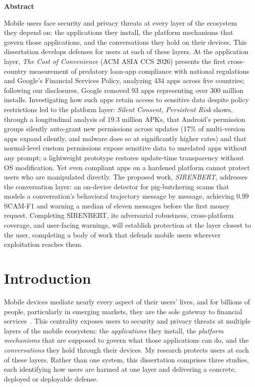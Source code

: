 \documentclass[letterpaper,11pt]{article}
\begin{document}
\begin{titlepage}
\begin{center}\bfseries Abstract\end{center}
\noindent
Mobile users face security and privacy threats at every layer of the
ecosystem they depend on: the applications they install, the platform
mechanisms that govern those applications, and the conversations they
hold on their devices. This dissertation develops defenses for users at
each of these layers. At the application layer, \emph{The Cost of
Convenience} (ACM ASIA CCS 2026) presents the first cross-country
measurement of predatory loan-app compliance with national regulations
and Google's Financial Services Policy, analyzing 434 apps across five
countries; following our disclosures, Google removed 93 apps
representing over 300 million installs. Investigating how such apps
retain access to sensitive data despite policy restrictions led to the
platform layer: \emph{Silent Consent, Persistent Risk} shows, through a
longitudinal analysis of 19.3 million APKs, that Android's permission
groups silently auto-grant new permissions across updates (17\% of
multi-version apps expand silently, and malware does so at
significantly higher rates) and that normal-level custom permissions
expose sensitive data to unrelated apps without any prompt; a
lightweight prototype restores update-time transparency without OS
modification. Yet even compliant apps on a hardened platform cannot
protect users who are manipulated directly. The proposed work,
\emph{SIRENBERT}, addresses the conversation layer: an on-device
detector for pig-butchering scams that models a conversation's
behavioral trajectory message by message, achieving 0.99 SCAM-F1 and
warning a median of eleven messages before the first money request.
Completing SIRENBERT, its adversarial robustness, cross-platform
coverage, and user-facing warnings, will establish protection at the
layer closest to the user, completing a body of work that defends
mobile users wherever exploitation reaches them.
\end{titlepage}


\section{Introduction}
\label{sec:intro}

Mobile devices mediate nearly every aspect of their users' lives, and
for billions of people, particularly in emerging markets, they are the
sole gateway to financial services~\cite{suri2016mpesa,findex2021}.
This centrality exposes users to security and privacy threats at
multiple layers of the mobile ecosystem: the \emph{applications} they
install, the \emph{platform mechanisms} that are supposed to govern
what those applications can do, and the \emph{conversations} they hold
through their devices. My research protects users at each of these
layers. Rather than one system, this dissertation comprises three
studies, each identifying how users are harmed at one layer and
delivering a concrete, deployed or deployable defense.
\end{document}
